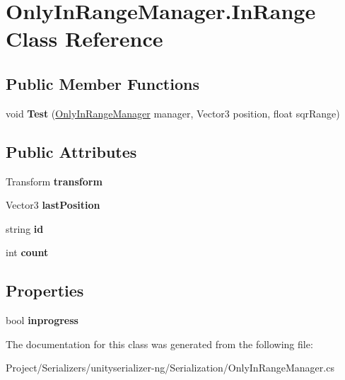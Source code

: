 \hypertarget{class_only_in_range_manager_1_1_in_range}{}\section{Only\+In\+Range\+Manager.\+In\+Range Class Reference}
\label{class_only_in_range_manager_1_1_in_range}
\subsection*{Public Member Functions}
\begin{DoxyCompactItemize}
\item 
\mbox{\label{class_only_in_range_manager_1_1_in_range_a80c40fca70b79239c1a9b2b17a8c7d35}} 
void {\bfseries Test} (\hyperlink{class_only_in_range_manager}{Only\+In\+Range\+Manager} manager, Vector3 position, float sqr\+Range)
\end{DoxyCompactItemize}
\subsection*{Public Attributes}
\begin{DoxyCompactItemize}
\item 
\mbox{\label{class_only_in_range_manager_1_1_in_range_ab5c9e0831b39bb97780c2d86b308af6a}} 
Transform {\bfseries transform}
\item 
\mbox{\label{class_only_in_range_manager_1_1_in_range_adde7399e58b8628d670e63a4ed88f2c8}} 
Vector3 {\bfseries last\+Position}
\item 
\mbox{\label{class_only_in_range_manager_1_1_in_range_a54aab3244d567e3c6caa9640c61f58e4}} 
string {\bfseries id}
\item 
\mbox{\label{class_only_in_range_manager_1_1_in_range_a892ad3f61f37dcd0ece666f6afbd2ede}} 
int {\bfseries count}
\end{DoxyCompactItemize}
\subsection*{Properties}
\begin{DoxyCompactItemize}
\item 
\mbox{\label{class_only_in_range_manager_1_1_in_range_a4938a7b5f149e6ae13e1cd471341c57a}} 
bool {\bfseries inprogress}
\end{DoxyCompactItemize}


The documentation for this class was generated from the following file\+:\begin{DoxyCompactItemize}
\item 
Project/\+Serializers/unityserializer-\/ng/\+Serialization/Only\+In\+Range\+Manager.\+cs\end{DoxyCompactItemize}
